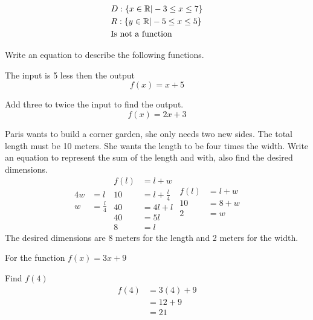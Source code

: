 \documentclass{exam}
\begin{document}
\begin{questions}
\begin{answers}{3}
        \answer \[
            \begin{aligned}
                &D: \{x \in \mathbb{R} |-3 \leq x \leq 7\}\\
                &R: \{y \in \mathbb{R} |-5 \leq x \leq 5\}\\
                &\text{Is not a function}
            \end{aligned} \]
    \end{answers}
    
    \question Write an equation to describe the following functions.

    \begin{answers}{2}
        \answer The input is 5 less then the output 
        \[
            f(x) = x + 5
        \]

        \answer Add three to twice the input to find the output.
        \[
            f(x) = 2x + 3
        \]

        \answer Paris wants to build a corner garden, she only needs two new sides. The total length must be 10 meters. She wants the length to be four times the width. Write an equation to represent the sum of the length and with, also find the desired dimensions.
        \[
            \begin{aligned}
                4w &= l\\
                w &= \frac{l}{4}\\
            \end{aligned}
            \begin{aligned}
                f(l) &= l + w\\
                10 &= l + \frac{l}{4}\\
                40 &= 4l + l\\
                40 &= 5l\\
                8 &= l
            \end{aligned}
            \begin{aligned}
                f(l) &= l + w\\
                10 &= 8 + w\\
                2 &= w\\
            \end{aligned}
        \]
    The desired dimensions are 8 meters for the length and 2 meters for the width.
    \end{answers}

    \question For the function \(f(x) = 3x + 9\)

    \begin{answers}{2}
        \answer Find \(f(4)\)
        \[
            \begin{aligned}
                f(4) &= 3(4) + 9\\
                    &= 12 + 9\\
                    &= 21\\
            \end{aligned} 
        \]


\end{answers}
\end{questions}
\end{document}
